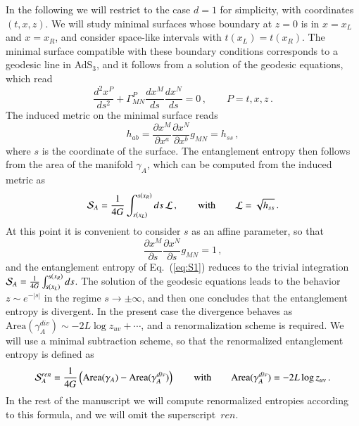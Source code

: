 \documentclass[epj]{webofc}
\begin{document}
In the following we will restrict to the case $d=1$ for simplicity, with coordinates $(t,x,z)$. We will study minimal surfaces whose boundary at $z=0$ is in $x = x_L$ and $x = x_R$, and consider space-like intervals with $t(x_L) = t(x_R)$. The minimal surface compatible with these boundary conditions corresponds to a geodesic line in AdS$_3$, and it follows from a solution of the geodesic equations, which read
\begin{equation}
\frac{d^2 x^P}{ds^2}  +\Gamma^P_{MN} \frac{dx^M}{ds} \frac{dx^N}{ds} = 0 \,, \qquad P= t,x,z \,.  \label{eq:geodesics}
\end{equation}
The induced metric on the minimal surface reads
\begin{equation}
h_{ab} = \frac{\partial x^M}{\partial x^a} \frac{\partial x^N}{\partial x^b} g_{MN} = h_{ss}  \,,
\end{equation} 
where $s$ is the coordinate of the surface. The entanglement entropy then follows from the area of the manifold $\gamma_A$, which can be computed from the induced metric as
\begin{equation}
{\cal S}_A = \frac{1}{4 G} \int_{s(x_L)}^{s(x_R)} ds \, {\cal L} \,, \qquad \textrm{with} \qquad {\cal L} = \sqrt{h_{ss}} \,. \label{eq:S1}
\end{equation}
At this point it is convenient to consider $s$ as an affine parameter, so that
\begin{equation}
\frac{\partial x^M}{\partial s}\frac{\partial x^N}{\partial s} g_{MN}   = 1 \,,
\end{equation}
and the entanglement entropy of Eq.~(\ref{eq:S1}) reduces to the trivial integration ${\cal S}_A = \frac{1}{4 G} \int_{s(x_L)}^{s(x_R)} ds$. The solution of the geodesic equations leads to the behavior $z \sim e^{-|s|}$ in the regime $s \to \pm \infty$, and then one concludes that the entanglement entropy is divergent. In the present case the divergence behaves as~${\textrm{Area}}(\gamma_A^{div}) \sim -2L \log z_{uv} + \cdots$, and a renormalization scheme is required. We will use a minimal subtraction scheme, so that the renormalized entanglement entropy is defined as
\begin{equation}
{\cal S}_A^{ren} = \frac{1}{4 G} \left( \textrm{Area}(\gamma_A) -  \textrm{Area}(\gamma_A^{div}) \right)  \qquad \textrm{with} \qquad   \textrm{Area}(\gamma_A^{div}) = -2 L \log z_{uv} \,. \label{eq:Sreg}
\end{equation}
In the rest of the manuscript we will compute renormalized entropies according to this formula, and we will omit the superscript~$ren$.
\end{document}
